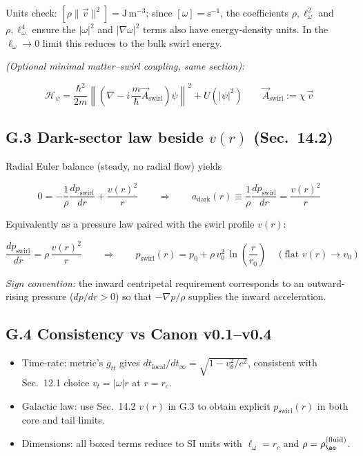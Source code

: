 \documentclass[11pt]{article}
\begin{document}
Units check: $[\rho \lVert \vec{v} \rVert^2] = \text{J}\,\text{m}^{-3}$; since $[\omega] = \text{s}^{-1}$, the coefficients $\rho, \ell_\omega^2$ and $\rho, \ell_\omega^4$ ensure the $|\omega|^2$ and $|\nabla \omega|^2$ terms also have energy-density units. In the $\ell_\omega \to 0$ limit this reduces to the bulk swirl energy.

\textit{(Optional minimal matter--swirl coupling, same section):}

\[
\boxed{
\mathcal{H}_\psi = \frac{\hbar^2}{2m} \left\lVert \left(\nabla - i\,\frac{m}{\hbar} \vec{A}_{\text{swirl}}\right) \psi \right\rVert^2 + U(|\psi|^2)
}
\qquad \vec{A}_{\text{swirl}} := \chi\,\vec{v}
\]

\subsection*{G.3 Dark-sector law beside $v(r)$ (Sec.~14.2)}

Radial Euler balance (steady, no radial flow) yields

\[
0 = -\frac{1}{\rho} \frac{dp_{\text{swirl}}}{dr} + \frac{v(r)^2}{r}
\qquad \Rightarrow \qquad
\boxed{
a_{\text{dark}}(r) \equiv \frac{1}{\rho} \frac{dp_{\text{swirl}}}{dr} = \frac{v(r)^2}{r}
}
\]

Equivalently as a pressure law paired with the swirl profile $v(r)$:

\[
\boxed{
\frac{dp_{\text{swirl}}}{dr} = \rho\,\frac{v(r)^2}{r}
}
\qquad \Longrightarrow \qquad
\boxed{
p_{\text{swirl}}(r) = p_0 + \rho\,v_0^2\,\ln\left(\frac{r}{r_0}\right)
}
\quad (\text{flat } v(r) \to v_0)
\]

\textit{Sign convention:} the inward centripetal requirement corresponds to an outward-rising pressure ($dp/dr > 0$) so that $-\nabla p/\rho$ supplies the inward acceleration.

\subsection*{G.4 Consistency vs Canon v0.1--v0.4}

\begin{itemize}
    \item Time-rate: metric's $g_{tt}$ gives $dt_{\text{local}}/dt_\infty = \sqrt{1- v_\theta^2/c^2}$, consistent with Sec.~12.1 choice $v_t = |\omega| r$ at $r = r_c$.
    \item Galactic law: use Sec.~14.2 $v(r)$ in G.3 to obtain explicit $p_{\text{swirl}}(r)$ in both core and tail limits.
    \item Dimensions: all boxed terms reduce to SI units with $\ell_\omega = r_c$ and $\rho = \rho_{\ae}^{(\text{fluid})}$.
\end{itemize}
\end{document}
